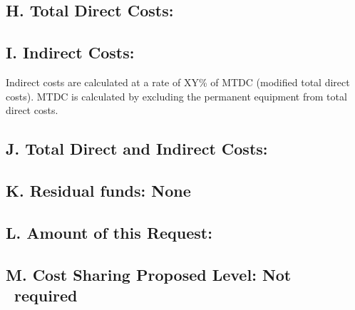 \subsection{H. Total Direct Costs: }

\subsection{I. Indirect Costs:}
Indirect costs are calculated at a rate of XY\% of MTDC (modified total direct costs). MTDC is calculated by excluding the permanent equipment from
total direct costs.


\subsection{ J. Total Direct and Indirect Costs: }

\subsection{K. Residual funds: {None}}

\subsection{\textbf{L. Amount of this Request: }}

\subsection{M. Cost Sharing Proposed Level: {Not ~required}}
